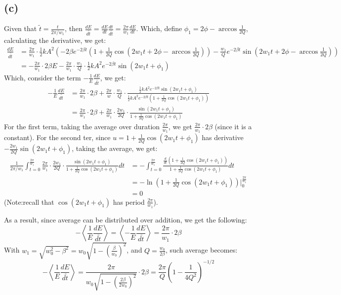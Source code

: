 \documentclass{article}
\begin{document}
\subsection*{(c)}
Given that $\tilde{t}=\frac{t}{2\pi/w_1}$, then $\frac{dE}{d\tilde{t}} = \frac{dE}{dt}\frac{dt}{d\tilde{t}} = \frac{2\pi}{w_1}\frac{dE}{dt}$. Which, define $\phi_1 = 2\phi-\arccos\frac{1}{2Q}$, calculating the derivative, we get:
\begin{align}
    \frac{dE}{d\tilde{t}} &= \frac{2\pi}{w_1}\cdot \frac{1}{2}kA^2\left(-2\beta e^{-2\beta t}\left(1+\frac{1}{2Q}\cos\left(2w_1t+2\phi-\arccos\frac{1}{2Q}\right)\right) -\frac{w_1}{Q}e^{-2\beta t}\sin\left(2w_1t+2\phi-\arccos\frac{1}{2Q}\right)\right)\\
    &= -\frac{2\pi}{w_1}\cdot 2\beta E-\frac{2\pi}{w_1}\cdot \frac{w_1}{Q}\cdot\frac{1}{2}kA^2e^{-2\beta t}\sin\left(2w_1t+\phi_1\right)
\end{align}
Which, consider the term $-\frac{1}{E}\frac{dE}{d\tilde{t}}$, we get:
\begin{align}
    -\frac{1}{E}\frac{dE}{d\tilde{t}} &= \frac{2\pi}{w_1}\cdot 2\beta +\frac{2\pi}{w}\cdot \frac{w_1}{Q}\cdot\frac{\frac{1}{2}kA^2e^{-2\beta t}\sin(2w_1t+\phi_1)}{\frac{1}{2}kA^2e^{-2\beta t}\left(1+\frac{1}{2Q}\cos\left(2w_1t+\phi_1\right)\right)}\\
    &= \frac{2\pi}{w_1}\cdot 2\beta+\frac{2\pi}{w_1}\cdot\frac{2w_1}{2Q}\cdot\frac{\sin(2w_1t+\phi_1)}{1+\frac{1}{2Q}\cos(2w_1t+\phi_1)}
\end{align}
For the first term, taking the average over duration $\frac{2\pi}{w_1}$, we get $\frac{2\pi}{w_1}\cdot 2\beta$ (since it is a constant). For the second ter, since $u=1+\frac{1}{2Q}\cos(2w_1t+\phi_1)$ has derivative $-\frac{2w_1}{2Q}\sin(2w_1t+\phi_1)$, taking the average, we get:
\begin{align}
    \frac{1}{2\pi/w_1}\int_{t=0}^\frac{2\pi}{w_1}\frac{2\pi}{w_1}\cdot\frac{2w_1}{2Q}\cdot\frac{\sin(2w_1t+\phi_1)}{1+\frac{1}{2Q}\cos(2w_1t+\phi_1)} dt &= -\int_{t=0}^{\frac{2\pi}{w_1}}\frac{\frac{d}{dt}\left(1+\frac{1}{2Q}\cos(2w_1t+\phi_1)\right)}{1+\frac{1}{2Q}\cos(2w_1t+\phi_1)}dt\\
    &= -\ln\left(1+\frac{1}{2Q}\cos(2w_1t+\phi_1)\right)\bigg|_{0}^{\frac{2\pi}{w_1}}\\
    &= 0
\end{align}
(Note:recall that $\cos(2w_1t+\phi_1)$ has period $\frac{2\pi}{w_1}$).
 
As a result, since average can be distributed over addition, we get the following:
\begin{equation}
    -\left<\frac{1}{E}\frac{dE}{d\tilde{t}}\right>=\left<-\frac{1}{E}\frac{dE}{d\tilde{t}}\right> = \frac{2\pi}{w_1}\cdot 2\beta
\end{equation}
With $w_1 = \sqrt{w_0^2-\beta^2} = w_0\sqrt{1-\left(\frac{\beta}{w_0}\right)^2}$, and $Q=\frac{w_0}{2\beta}$, such average becomes:
\begin{equation}
    -\left<\frac{1}{E}\frac{dE}{d\tilde{t}}\right> = \frac{2\pi}{w_0\sqrt{1-\left(\frac{2\beta}{2w_0}\right)^2}}\cdot 2\beta  = \frac{2\pi}{Q}\left(1-\frac{1}{4Q^2}\right)^{-1/2}
\end{equation}
\end{document}
